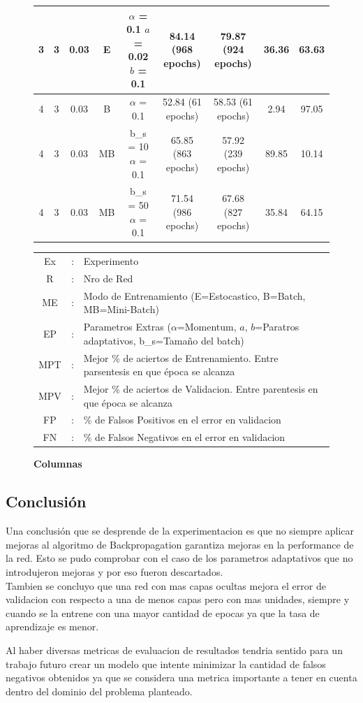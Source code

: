 \begin{figure}[H]
\begin{longtable}{ccccccccc}
	\hline
	3 & 3 & 0.03 & E  & \tcell{$\alpha$ = 0.1\\ $a$ = 0.02\\ $b$ = 0.1} & 84.14 (968 epochs) & 79.87 (924 epochs) & 36.36  & 63.63 \\
	\hline
	\hline
	4 & 3 & 0.03 & B  & $\alpha$ = 0.1                        & 52.84 (61 epochs)  & 58.53 (61 epochs)  & 2.94   & 97.05 \\
	\hline
	4 & 3 & 0.03 & MB & \tcell{b\_s = 10\\ $\alpha$ = 0.1}      & 65.85 (863 epochs) & 57.92 (239 epochs) & 89.85  & 10.14 \\
	\hline
	4 & 3 & 0.03 & MB & \tcell{b\_s = 50\\ $\alpha$ = 0.1}      & 71.54 (986 epochs) & 67.68 (827 epochs) & 35.84  & 64.15 \\
	\hline
\end{longtable}
\caption{\textbf{Columnas}}
\begin{tabular}{ccl}
         Ex & : & Experimento \\
         R & : & Nro de Red \\
         ME & : & Modo de Entrenamiento (E=Estocastico, B=Batch, MB=Mini-Batch)\\
         EP & : & Parametros Extras ($\alpha$=Momentum, $a$, $b$=Paratros adaptativos, b\_s=Tamaño del batch)\\
         MPT & : & Mejor \% de aciertos de Entrenamiento. Entre parsentesis en que época se alcanza\\
         MPV & : & Mejor \% de aciertos de Validacion. Entre parentesis en que época se alcanza\\
         FP & : & \% de Falsos Positivos en el error en validacion\\
         FN & : & \% de Falsos Negativos en el error en validacion
\end{tabular}
\end{figure}



\subsection{Conclusión}
Una conclusión que se desprende de la experimentacion es que no siempre aplicar mejoras al algoritmo de Backpropagation garantiza mejoras en la performance de la red. Esto
se pudo comprobar con el caso de los parametros adaptativos que no introdujeron mejoras y por eso fueron descartados. \\
Tambien se concluyo que una red con mas capas ocultas mejora el error de validacion con respecto a una de menos capas pero con mas unidades, siempre y cuando se la entrene
con una mayor cantidad de epocas ya que la tasa de aprendizaje es menor.

Al haber diversas metricas de evaluacion de resultados tendria sentido para un trabajo futuro crear un modelo que intente minimizar la cantidad de falsos negativos obtenidos
 ya que se considera una metrica importante a tener en cuenta dentro del dominio del problema planteado.

\newpage
